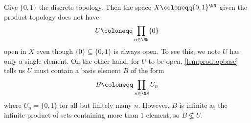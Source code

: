 \documentclass[../notes.tex]{subfiles}
\begin{document}
\begin{example}
	Give $\{0,1\}$ the discrete topology. Then the space $X\coloneqq\{0,1\}^\NN$ given the product topology does not have
	\[U\coloneqq\prod_{n\in\NN}\{0\}\]
	open in $X$ even though $\{0\}\subseteq\{0,1\}$ is always open. To see this, we note $U$ has only a single element. On the other hand, for $U$ to be open, \autoref{lem:prodtopbase} tells us $U$ must contain a basis element $B$ of the form
	\[B\coloneqq\prod_{n\in\NN}U_n\]
	where $U_n=\{0,1\}$ for all but finitely many $n$. However, $B$ is infinite as the infinite product of sets containing more than $1$ element, so $B\not\subseteq U$.
\end{example}
\end{document}
